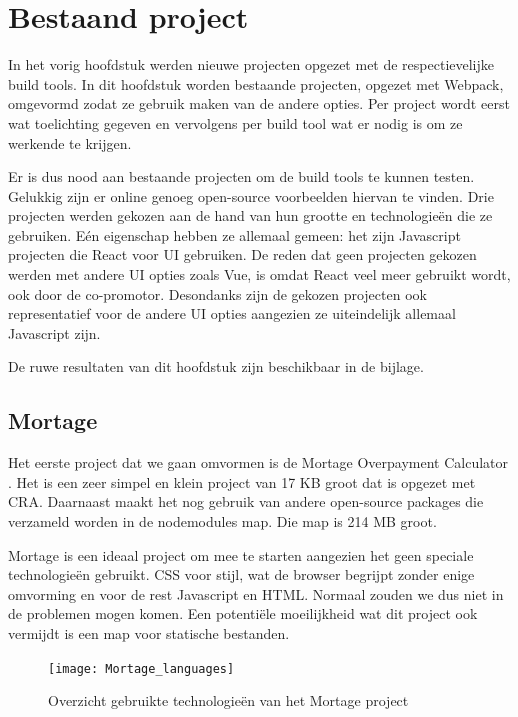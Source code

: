 \chapter{Bestaand project}

In het vorig hoofdstuk werden nieuwe projecten opgezet met de respectievelijke build tools. In dit hoofdstuk worden bestaande projecten, opgezet met Webpack, omgevormd zodat ze gebruik maken van de andere opties. Per project wordt eerst wat toelichting gegeven en vervolgens per build tool wat er nodig is om ze werkende te krijgen.

Er is dus nood aan bestaande projecten om de build tools te kunnen testen. Gelukkig zijn er online genoeg open-source voorbeelden hiervan te vinden. Drie projecten werden gekozen aan de hand van hun grootte en technologieën die ze gebruiken. Eén eigenschap hebben ze allemaal gemeen: het zijn Javascript projecten die React voor UI gebruiken. De reden dat geen projecten gekozen werden met andere UI opties zoals Vue, is omdat React veel meer gebruikt wordt, ook door de co-promotor. Desondanks zijn de gekozen projecten ook representatief voor de andere UI opties aangezien ze uiteindelijk allemaal Javascript zijn.

De ruwe resultaten van dit hoofdstuk zijn beschikbaar in de bijlage.

\section{Mortage}
Het eerste project dat we gaan omvormen is de Mortage Overpayment Calculator \autocite{houghton-2019}.
Het is een zeer simpel en klein project van 17 KB groot dat is opgezet met CRA.
Daarnaast maakt het nog gebruik van andere open-source packages die verzameld worden in de nodemodules map.
Die map is 214 MB groot.

Mortage is een ideaal project om mee te starten aangezien het geen speciale technologieën gebruikt. CSS voor stijl, wat de browser begrijpt zonder enige omvorming en voor de rest Javascript en HTML. Normaal zouden we dus niet in de problemen mogen komen. Een potentiële moeilijkheid wat dit project ook vermijdt is een map voor statische bestanden.

\begin{figure}[h]
   \texttt{[image: Mortage\_languages]}
       \centering
       \caption{Overzicht gebruikte technologieën van het Mortage project}
 \end{figure}

